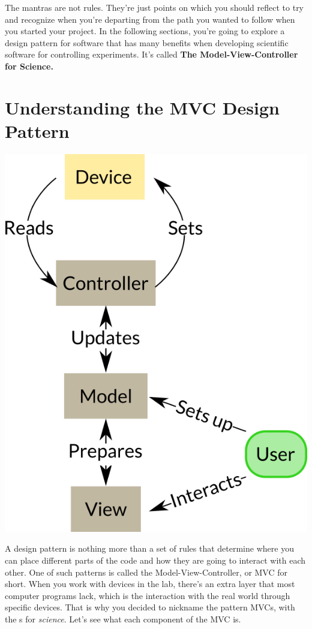The mantras are not rules. They're just points on which you should reflect to try and recognize when you're departing from the path you wanted to follow when you started your project. In the following sections, you're going to explore a design pattern for software that has many benefits when developing scientific software for controlling experiments. It's called \textbf{The Model-View-Controller for Science.}

\section{Understanding the MVC Design Pattern}\label{sec:mvc}
\begin{center}
\includegraphics{images/Chapter_04/MVCs.png}
\end{center}

A design pattern is nothing more than a set of rules that determine where you can place different parts of the code and how they are going to interact with each other. One of such patterns is called the Model-View-Controller, or MVC for short. When you work with devices in the lab, there's an extra layer that most computer programs lack, which is the interaction with the real world through specific devices. That is why you decided to nickname the pattern MVCs, with the s for \emph{science}. Let's see what each component of the MVC is.

